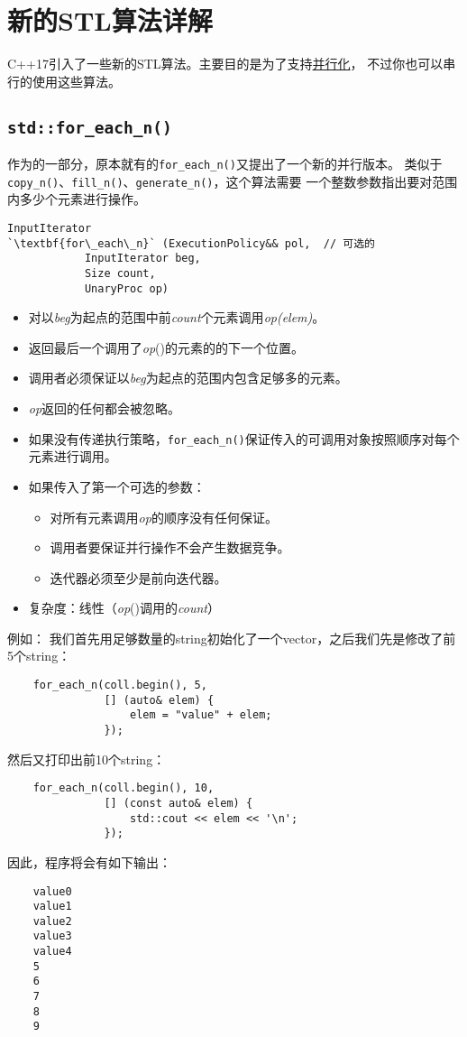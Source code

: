 \chapter{新的STL算法详解}\label{ch23}
C++17引入了一些新的STL算法。主要目的是为了支持\hyperref[ch22]{并行化}，
不过你也可以串行的使用这些算法。


\section{\texttt{std::for\_each\_n()}}
作为的一部分，原本就有的\texttt{for\_each\_n()}又提出了一个新的并行版本。
类似于\texttt{copy\_n()}、\texttt{fill\_n()}、\texttt{generate\_n()}，这个算法需要
一个整数参数指出要对范围内多少个元素进行操作。
\begin{lstlisting}[frame=single,xleftmargin=13pt,xrightmargin=13pt]
InputIterator
`\textbf{for\_each\_n}` (ExecutionPolicy&& pol,  // 可选的
            InputIterator beg,
            Size count,
            UnaryProc op)
\end{lstlisting}
\begin{itemize}
    \item 对以\emph{beg}为起点的范围中前\emph{count}个元素调用\emph{op(elem)}。
    \item 返回最后一个调用了\emph{op}()的元素的的下一个位置。
    \item 调用者必须保证以\emph{beg}为起点的范围内包含足够多的元素。
    \item \emph{op}返回的任何都会被忽略。
    \item 如果没有传递执行策略，\texttt{for\_each\_n()}保证传入的可调用对象按照顺序对每个元素进行调用。
    \item 如果传入了第一个可选的参数：
    \begin{itemize}
        \item 对所有元素调用\emph{op}的顺序没有任何保证。
        \item 调用者要保证并行操作不会产生数据竞争。
        \item 迭代器必须至少是前向迭代器。
    \end{itemize}
    \item 复杂度：线性（\emph{op}()调用的\emph{count}）
\end{itemize}
例如：
我们首先用足够数量的string初始化了一个vector，之后我们先是修改了前5个string：
\begin{lstlisting}
    for_each_n(coll.begin(), 5,
               [] (auto& elem) {
                   elem = "value" + elem;
               });
\end{lstlisting}
然后又打印出前10个string：
\begin{lstlisting}
    for_each_n(coll.begin(), 10,
               [] (const auto& elem) {
                   std::cout << elem << '\n';
               });
\end{lstlisting}
因此，程序将会有如下输出：
\begin{lstlisting}
    value0
    value1
    value2
    value3
    value4
    5
    6
    7
    8
    9
\end{lstlisting}


